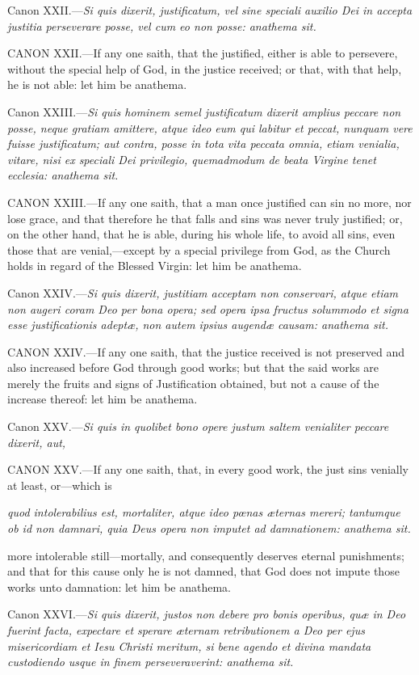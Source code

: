 Canon XXII.—\emph{Si quis dixerit, justificatum, vel sine speciali auxilio Dei in accepta justitia perseverare posse, vel cum eo non posse: anathema sit.}

CANON XXII.—If any one saith, that the justified, either is able to persevere, without the special help of God, in the justice received; or that, with that help, he is not able: let him be anathema.

Canon XXIII.—\emph{Si quis hominem semel justificatum dixerit amplius peccare non posse, neque gratiam amittere, atque ideo eum qui labitur et peccat, nunquam vere fuisse justificatum; aut contra, posse in tota vita peccata omnia, etiam venialia, vitare, nisi ex speciali Dei privilegio, quemadmodum de beata Virgine tenet ecclesia: anathema sit.}

CANON XXIII.—If any one saith, that a man once justified can sin no more, nor lose grace, and that therefore he that falls and sins was never truly justified; or, on the other hand, that he is able, during his whole life, to avoid all sins, even those that are venial,—except by a special privilege from God, as the Church holds in regard of the Blessed Virgin: let him be anathema.

Canon XXIV.—\emph{Si quis dixerit, justitiam acceptam non conservari, atque etiam non augeri coram Deo per bona opera; sed opera ipsa fructus solummodo et signa esse justificationis adeptæ, non autem ipsius augendæ causam: anathema sit.}

CANON XXIV.—If any one saith, that the justice received is not preserved and also increased before God through good works; but that the said works are merely the fruits and signs of Justification obtained, but not a cause of the increase thereof: let him be anathema.

Canon XXV.—\emph{Si quis in quolibet bono opere justum saltem venialiter peccare dixerit, aut, }

CANON XXV.—If any one saith, that, in every good work, the just sins venially at least, or—which is

\emph{quod intolerabilius est, mortaliter, atque ideo pœnas æternas mereri; tantumque ob id non damnari, quia Deus opera non imputet ad damnationem: anathema sit.}

more intolerable still—mortally, and consequently deserves eternal punishments; and that for this cause only he is not damned, that God does not impute those works unto damnation: let him be anathema.

Canon XXVI.—\emph{Si quis dixerit, justos non debere pro bonis operibus, quæ in Deo fuerint facta, expectare et sperare æternam retributionem a Deo per ejus misericordiam et Iesu Christi meritum, si bene agendo et divina mandata custodiendo usque in finem perseveraverint: anathema sit.}

